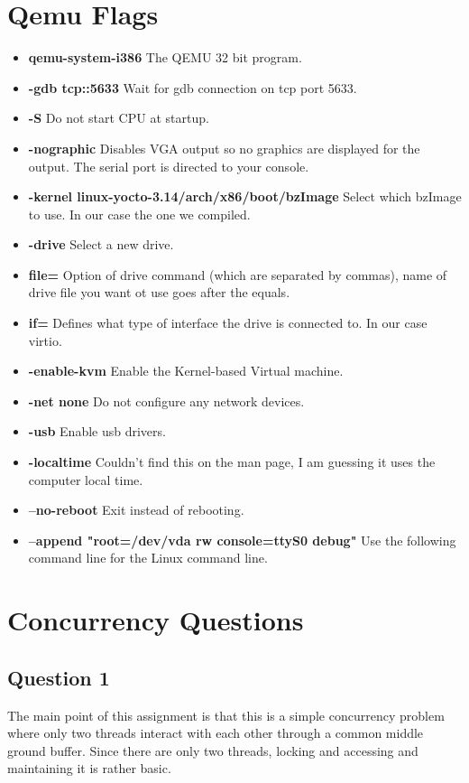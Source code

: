 \documentclass[10pt,draftclsnofoot,onecolumn, compsoc]{IEEEtran}
\begin{document}
\section{Qemu Flags}
\begin{itemize}
	\item {\bf qemu-system-i386}  The QEMU 32 bit program.
	\item {\bf -gdb tcp::5633}  Wait for gdb connection on tcp port 5633.
	\item {\bf -S} Do not start CPU at startup.
	\item {\bf -nographic} Disables VGA output so no graphics are displayed for the output. The serial port is directed to your console.
	\item {\bf -kernel linux-yocto-3.14/arch/x86/boot/bzImage} Select which bzImage to use. In our case the one we compiled.
	\item {\bf -drive} Select a new drive.
	\item {\bf file=} Option of drive command (which are separated by commas), name of drive file you want ot use goes after the equals.
	\item {\bf if=} Defines what type of interface the drive is connected to. In our case virtio.
	\item {\bf -enable-kvm} Enable the Kernel-based Virtual machine.
	\item {\bf -net none} Do not configure any network devices.
	\item {\bf -usb} Enable usb drivers.
	\item {\bf -localtime} Couldn't find this on the man page, I am guessing it uses the computer local time.
	\item {\bf --no-reboot} Exit instead of rebooting.
	\item {\bf --append "root=/dev/vda rw console=ttyS0 debug"} Use the following command line for the Linux command line.
\end{itemize}

\section{Concurrency Questions}
\subsection{Question 1}
The main point of this assignment is that this is a simple concurrency problem where only two threads interact with each other through a common middle ground buffer. Since there are only two threads, locking and accessing and maintaining it is rather basic.
\end{document}
